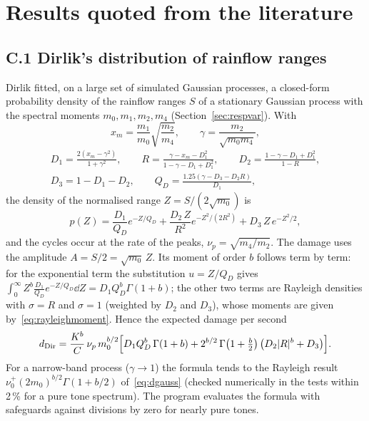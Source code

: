 \section{Results quoted from the literature}\label{app:quoted}

\subsection*{C.1 Dirlik's distribution of rainflow ranges}\label{app:dirlik}

Dirlik fitted, on a large set of simulated Gaussian processes, a closed-form probability density of
the rainflow ranges $S$ of a stationary Gaussian process with the spectral moments $m_0,m_1,m_2,m_4$
(Section~\ref{sec:respvar}). With
\begin{equation}
  x_m = \frac{m_1}{m_0}\sqrt{\frac{m_2}{m_4}},\qquad \gamma = \frac{m_2}{\sqrt{m_0m_4}},
\end{equation}
\begin{gather}
  D_1 = \frac{2(x_m-\gamma^2)}{1+\gamma^2},\qquad
  R = \frac{\gamma - x_m - D_1^2}{1-\gamma-D_1+D_1^2},\qquad
  D_2 = \frac{1-\gamma-D_1+D_1^2}{1-R},\\
  D_3 = 1-D_1-D_2,\qquad
  Q_D = \frac{1.25(\gamma-D_3-D_2R)}{D_1},
\end{gather}
the density of the normalised range $Z = S/(2\sqrt{m_0})$ is
\begin{equation}
  p(Z) = \frac{D_1}{Q_D}e^{-Z/Q_D} + \frac{D_2\,Z}{R^2}e^{-Z^2/(2R^2)} + D_3\,Z\,e^{-Z^2/2},
\end{equation}
and the cycles occur at the rate of the peaks, $\nu_p = \sqrt{m_4/m_2}$. The damage uses the amplitude
$A = S/2 = \sqrt{m_0}\,Z$. Its moment of order $b$ follows term by term: for the exponential term the
substitution $u = Z/Q_D$ gives $\int_0^\infty Z^b\frac{D_1}{Q_D}e^{-Z/Q_D}\dd Z = D_1Q_D^b\Gamma(1+b)$;
the other two terms are Rayleigh densities with $\sigma = R$ and $\sigma=1$ (weighted by $D_2$ and $D_3$),
whose moments are given by~\eqref{eq:rayleighmoment}. Hence the expected damage per second
\begin{equation}
  d_{\mathrm{Dir}} = \frac{K^b}{C}\,\nu_p\,m_0^{b/2}\Bigl[D_1Q_D^b\,\Gamma(1+b) +
  2^{b/2}\,\Gamma\!\left(1+\tfrac b2\right)\bigl(D_2|R|^b + D_3\bigr)\Bigr].
\end{equation}
For a narrow-band process ($\gamma\to1$) the formula tends to the Rayleigh result $\nu_0^+(2m_0)^{b/2}
\Gamma(1+b/2)$ of~\eqref{eq:dgauss} (checked numerically in the tests within 2\,\% for a pure tone
spectrum). The program evaluates the formula with safeguards against divisions by zero for nearly
pure tones.

